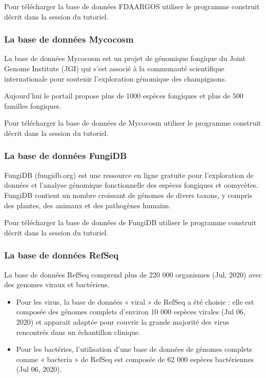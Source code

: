 \documentclass[letterpaper,10pt,french]{sphinxmanual}
\begin{document}
Pour télécharger la base de données FDA\sphinxhyphen{}ARGOS utiliser le programme construit décrit dans la session {\hyperref[\detokenize{tutorial:download-fda-argos}]{}} du tutoriel.


\subsubsection{La base de données Mycocosm}
\label{\detokenize{overview:la-base-de-donnees-mycocosm}}
La base de données Mycocosm est un projet de génomique fongique du Joint Genome Institute (JGI) qui s’est associé à la communauté scientifique internationale pour soutenir l’exploration génomique des champignons.

Aujourd’hui le portail propose plus de 1000 espèces fongiques et plus de 500 familles fongiques.

Pour télécharger la base de données de Mycocosm utiliser le programme construit décrit dans la session {\hyperref[\detokenize{tutorial:download-mycocosm}]{}} du tutoriel.


\subsubsection{La base de données FungiDB}
\label{\detokenize{overview:la-base-de-donnees-fungidb}}
FungiDB (fungidb.org) est une ressource en ligne gratuite pour l’exploration de données et l’analyse génomique fonctionnelle des espèces fongiques et oomycètes. FungiDB contient un nombre croissant de génomes de divers taxons, y compris des plantes, des animaux et des pathogènes humains.

Pour télécharger la base de données de FungiDB utiliser le programme construit décrit dans la session {\hyperref[\detokenize{tutorial:download-fungidb}]{}} du tutoriel.


\subsubsection{La base de données RefSeq}
\label{\detokenize{overview:la-base-de-donnees-refseq}}
La base de données RefSeq comprend plus de 220 000 organismes (Jul, 2020) avec des genomes viraux et bactériens.
\begin{itemize}
\item {} 
Pour les virus, la base de données « viral » de RefSeq a été choisie : elle est composée des génomes complets d’environ 10 000 espèces virales (Jul 06, 2020) et apparait adaptée pour couvrir la grande majorité des virus rencontrés dans un échantillon clinique.

\item {} 
Pour les bactéries, l’utilisation d’une base de données de génomes complets comme « bacteria » de RefSeq est composée de 62 000 espèces bactériennes (Jul 06, 2020).

\end{itemize}
\end{document}
